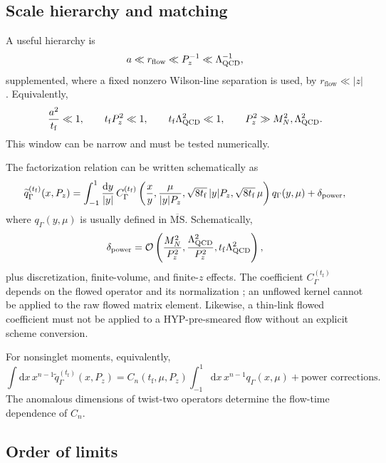 \documentclass[11pt]{article}
\numberwithin{equation}{section}
\newcommand{\dd}{\mathrm{d}}
\newcommand{\MSbar}{\overline{\mathrm{MS}}}
\newcommand{\cO}{\mathcal{O}}
\newcommand{\rflow}{r_{\mathrm{flow}}}
\newcommand{\tf}{t_{\mathrm f}}
\newcommand{\qtilde}{\widetilde q}
\begin{document}
\subsection{Scale hierarchy and matching}

A useful hierarchy is
\begin{equation}
  a \ll \rflow
  \ll P_z^{-1}
  \ll \Lambda_{\rm QCD}^{-1},
  \label{eq:scale-hierarchy}
\end{equation}
supplemented, where a fixed nonzero Wilson-line separation is used, by
\(\rflow\ll |z|\). Equivalently,
\begin{equation}
  \frac{a^2}{\tf}\ll1,
  \qquad
  \tf P_z^2\ll1,
  \qquad
  \tf\Lambda_{\rm QCD}^2\ll1,
  \qquad
  P_z^2\gg M_N^2,\Lambda_{\rm QCD}^2.
\end{equation}
This window can be narrow and must be tested numerically.

The factorization relation can be written schematically as
\begin{equation}
  \qtilde_\Gamma^{(\tf)}(x,P_z)
  =
  \int_{-1}^{1}\frac{\dd y}{|y|}\,
  C_\Gamma^{(\tf)}
  \left(
    \frac{x}{y},
    \frac{\mu}{|y|P_z},
    \sqrt{8\tf}\,|y|P_z,
    \sqrt{8\tf}\,\mu
  \right)
  q_\Gamma(y,\mu)
  +\delta_{\rm power},
  \label{eq:factorization}
\end{equation}
where \(q_\Gamma(y,\mu)\) is usually defined in \(\MSbar\). Schematically,
\begin{equation}
  \delta_{\rm power}
  =
  \cO\left(
    \frac{M_N^2}{P_z^2},
    \frac{\Lambda_{\rm QCD}^2}{P_z^2},
    \tf\Lambda_{\rm QCD}^2
  \right),
\end{equation}
plus discretization, finite-volume, and finite-\(z\) effects. The coefficient
\(C_\Gamma^{(\tf)}\) depends on the flowed operator and its normalization
\cite{MonahanOrginos2017,Monahan2018}; an unflowed kernel cannot be applied to
the raw flowed matrix element. Likewise, a thin-link flowed coefficient must
not be applied to a HYP-pre-smeared flow without an explicit scheme
conversion.

For nonsinglet moments, equivalently,
\begin{equation}
  \int\dd x\,x^{n-1}\qtilde_\Gamma^{(\tf)}(x,P_z)
  =
  C_n(\tf,\mu,P_z)
  \int_{-1}^{1}\dd x\,x^{n-1}q_\Gamma(x,\mu)
  +\text{power corrections}.
\end{equation}
The anomalous dimensions of twist-two operators determine the flow-time
dependence of \(C_n\).

\subsection{Order of limits}
\end{document}
